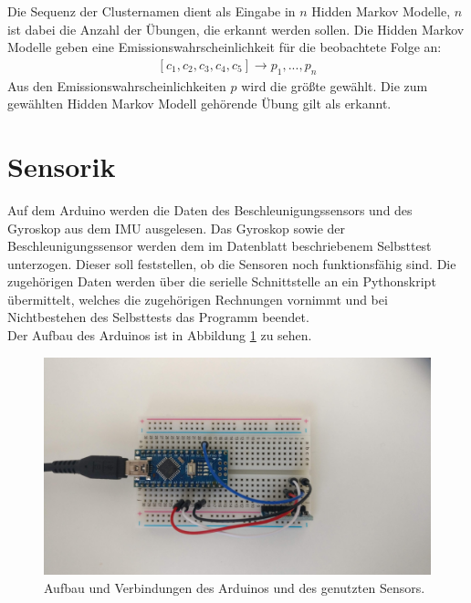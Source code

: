 \documentclass{article}
\begin{document}
Die Sequenz der Clusternamen dient als Eingabe in $n$ Hidden Markov Modelle, $n$ ist dabei die Anzahl der Übungen, die erkannt werden sollen.
Die Hidden Markov Modelle geben eine Emissionswahrscheinlichkeit für die beobachtete Folge an:
\begin{align*}
\left[c_1, c_2, c_3, c_4, c_5\right] \rightarrow p_1, ..., p_n
\end{align*}
Aus den Emissionswahrscheinlichkeiten $p$ wird die größte gewählt.
Die zum gewählten Hidden Markov Modell gehörende Übung gilt als erkannt.

\newpage
\section{Sensorik}
\label{sec:sensors}
Auf dem Arduino werden die Daten des Beschleunigungssensors und des Gyroskop aus dem IMU ausgelesen.
Das Gyroskop sowie der Beschleunigungssensor werden dem im Datenblatt beschriebenem Selbsttest unterzogen.
Dieser soll feststellen, ob die Sensoren noch funktionsfähig sind.
Die zugehörigen Daten werden über die serielle Schnittstelle an ein Pythonskript übermittelt, welches die zugehörigen Rechnungen vornimmt und bei Nichtbestehen des Selbsttests das Programm beendet.\\
Der Aufbau des Arduinos ist in Abbildung \ref{fig:arduino} zu sehen.
\begin{figure}[htbp]
\centering
\includegraphics[width=\textwidth]{figures/aufbau.jpg}
\caption{Aufbau und Verbindungen des Arduinos und des genutzten Sensors.}
\label{fig:arduino}
\end{figure}\\
\end{document}
